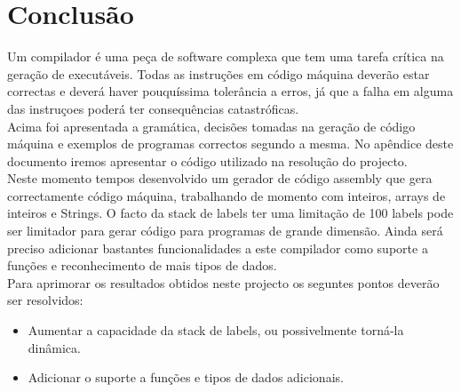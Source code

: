 \documentclass{report}
\begin{document}
\chapter{Conclusão} \label {conc}
Um compilador é uma peça de software complexa que tem uma tarefa crítica na geração de executáveis. Todas as instruções em código máquina deverão estar correctas e deverá haver pouquíssima tolerância a erros, já que a falha em alguma das instruçoes poderá ter consequências catastróficas.\\Acima foi apresentada a gramática, decisões tomadas na geração de código máquina e exemplos de programas correctos segundo a mesma. No apêndice deste documento iremos apresentar o código utilizado na resolução do projecto.\\
Neste momento tempos desenvolvido um gerador de código assembly que gera correctamente código máquina, trabalhando de momento com inteiros, arrays de inteiros e Strings. O facto da stack de labels ter uma limitação de 100 labels pode ser limitador para gerar código para programas de grande dimensão. Ainda será preciso adicionar bastantes funcionalidades a este compilador como suporte a funções e reconhecimento de mais tipos de dados.\\
Para aprimorar os resultados obtidos neste projecto os seguntes pontos deverão ser resolvidos:\\
\begin{itemize}
	\item Aumentar a capacidade da stack de labels, ou possivelmente torná-la dinâmica.
	\item Adicionar o suporte a funções e tipos de dados adicionais.
\end{itemize}

\appendix
\end{document}
